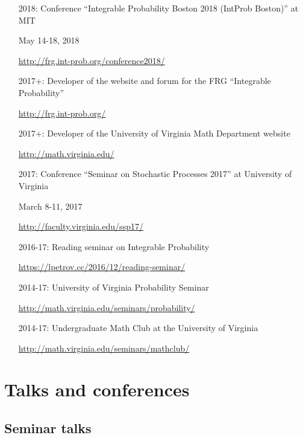 \documentclass[letterpaper,11pt]{article}
\begin{document}
\begin{itemize}
	\item [2018:]
		Conference 
		``Integrable Probability Boston 2018 (IntProb Boston)''
		at MIT

		May 14-18, 2018
	
		\url{http://frg.int-prob.org/conference2018/}


	\item [2017+:]
		Developer of the website and forum for the FRG ``Integrable Probability''

		\url{http://frg.int-prob.org/}

	\item [2017+:]
		Developer of the University of Virginia Math Department website

		\url{http://math.virginia.edu/}
	\item
	      [2017:] Conference
	      ``Seminar on Stochastic Processes 2017'' at University of
		Virginia
		
		March 8-11, 2017

	      \url{http://faculty.virginia.edu/ssp17/}
	\item
	      [2016-17:]
	      Reading seminar on Integrable Probability

	      \url{https://lpetrov.cc/2016/12/reading-seminar/}
	\item
	      [2014-17:] University of Virginia Probability Seminar

	      \url{http://math.virginia.edu/seminars/probability/}
	\item
	      [2014-17:]
	      Undergraduate Math Club at the University of Virginia

	      \url{http://math.virginia.edu/seminars/mathclub/}
\end{itemize}

\section*{Talks and conferences}

\subsection*{Seminar talks}
\end{document}
